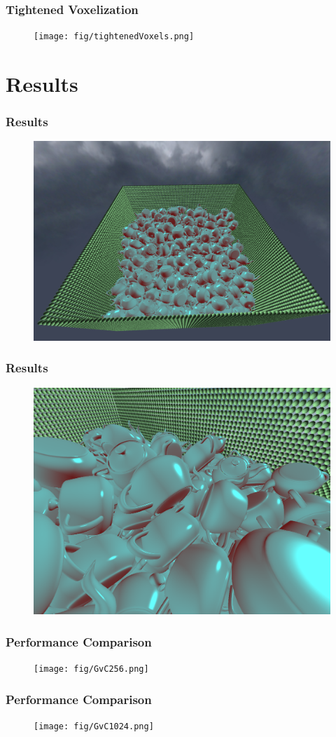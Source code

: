 \documentclass{beamer}
\begin{document}
	\begin{frame}
		\frametitle{Tightened Voxelization}
		\begin{figure}
			\texttt{[image: fig/tightenedVoxels.png]}
		\end{figure}
	\end{frame}

	\section{Results}
	\begin{frame}
		\frametitle{Results}
		\begin{figure}
			\includegraphics[width=0.6\linewidth]{fig/finishedSphoxTeapot.png}
		\end{figure}
	\end{frame}
	\begin{frame}
		\frametitle{Results}
		\begin{figure}
			\includegraphics[width=0.6\linewidth]{fig/closeUpSphox.png}
		\end{figure}
	\end{frame}

	\begin{frame}
		\frametitle{Performance Comparison}
		\begin{figure}
			\texttt{[image: fig/GvC256.png]}
		\end{figure}
	\end{frame}
	\begin{frame}
		\frametitle{Performance Comparison}
		\begin{figure}
			\texttt{[image: fig/GvC1024.png]}
		\end{figure}
	\end{frame}
\end{document}
